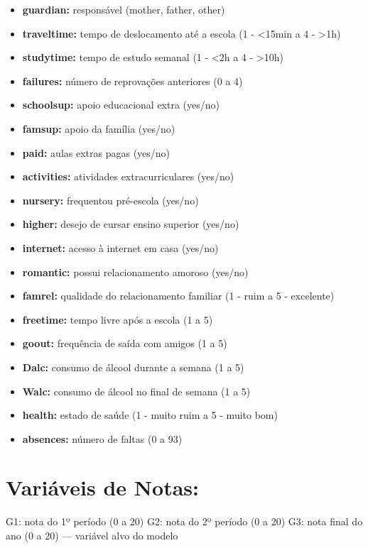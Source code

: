 \documentclass[
  letterpaper,
  DIV=11,
  numbers=noendperiod,
  openany]{scrreprt}
\providecommand{\tightlist}{%
  \setlength{\itemsep}{0pt}\setlength{\parskip}{0pt}}
\begin{document}
\begin{itemize}
\tightlist
\item
  \textbf{guardian:} responsável (mother, father, other)
\item
  \textbf{traveltime:} tempo de deslocamento até a escola (1 -
  \textless15min a 4 - \textgreater1h)
\item
  \textbf{studytime:} tempo de estudo semanal (1 - \textless2h a 4 -
  \textgreater10h)
\item
  \textbf{failures:} número de reprovações anteriores (0 a 4)
\item
  \textbf{schoolsup:} apoio educacional extra (yes/no)
\item
  \textbf{famsup:} apoio da família (yes/no)
\item
  \textbf{paid:} aulas extras pagas (yes/no)
\item
  \textbf{activities:} atividades extracurriculares (yes/no)
\item
  \textbf{nursery:} frequentou pré-escola (yes/no)
\item
  \textbf{higher:} desejo de cursar ensino superior (yes/no)
\item
  \textbf{internet:} acesso à internet em casa (yes/no)
\item
  \textbf{romantic:} possui relacionamento amoroso (yes/no)
\item
  \textbf{famrel:} qualidade do relacionamento familiar (1 - ruim a 5 -
  excelente)
\item
  \textbf{freetime:} tempo livre após a escola (1 a 5)
\item
  \textbf{goout:} frequência de saída com amigos (1 a 5)
\item
  \textbf{Dalc:} consumo de álcool durante a semana (1 a 5)
\item
  \textbf{Walc:} consumo de álcool no final de semana (1 a 5)
\item
  \textbf{health:} estado de saúde (1 - muito ruim a 5 - muito bom)
\item
  \textbf{absences:} número de faltas (0 a 93)
\end{itemize}

\section{Variáveis de Notas:}\label{variuxe1veis-de-notas}

G1: nota do 1º período (0 a 20) G2: nota do 2º período (0 a 20) G3: nota
final do ano (0 a 20) --- variável alvo do modelo
\end{document}
